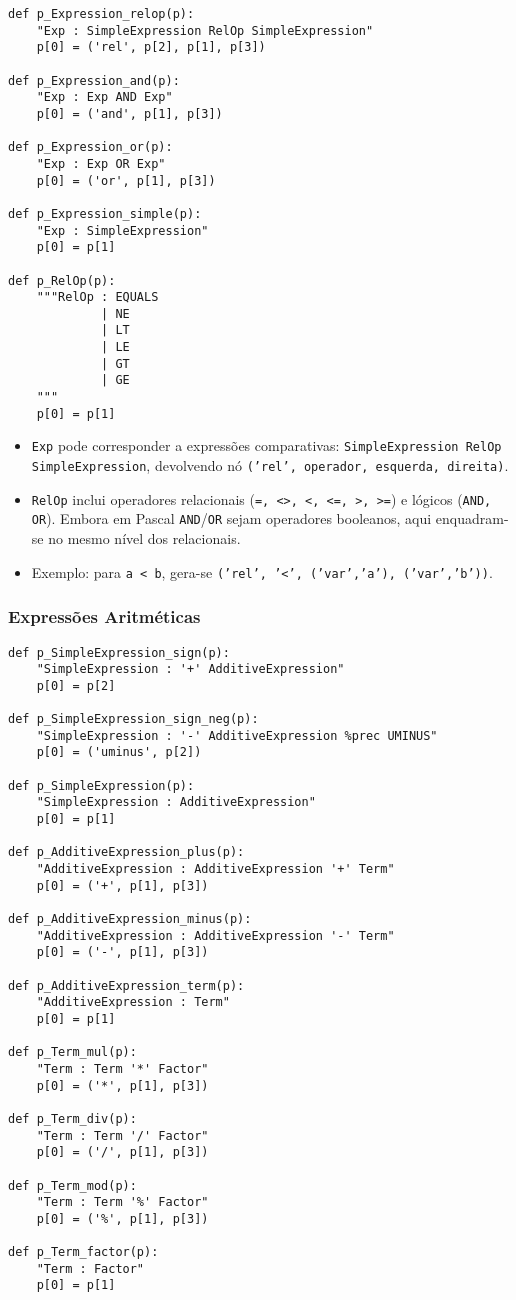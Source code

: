 \begin{verbatim}
def p_Expression_relop(p):
    "Exp : SimpleExpression RelOp SimpleExpression"
    p[0] = ('rel', p[2], p[1], p[3])

def p_Expression_and(p):
    "Exp : Exp AND Exp"
    p[0] = ('and', p[1], p[3])

def p_Expression_or(p):
    "Exp : Exp OR Exp"
    p[0] = ('or', p[1], p[3])

def p_Expression_simple(p):
    "Exp : SimpleExpression"
    p[0] = p[1]

def p_RelOp(p):
    """RelOp : EQUALS
             | NE
             | LT
             | LE
             | GT
             | GE
    """
    p[0] = p[1]
\end{verbatim}

\noindent

\begin{itemize}
    \item \texttt{Exp} pode corresponder a expressões comparativas: \texttt{SimpleExpression RelOp SimpleExpression}, devolvendo nó \texttt{('rel', operador, esquerda, direita)}.
    \item \texttt{RelOp} inclui operadores relacionais (\texttt{=, <>, <, <=, >, >=}) e lógicos (\texttt{AND, OR}). Embora em Pascal \texttt{AND}/\texttt{OR} sejam operadores booleanos, aqui enquadram-se no mesmo nível dos relacionais.
    \item Exemplo: para \texttt{a < b}, gera-se \texttt{('rel', '<', ('var','a'), ('var','b'))}.
\end{itemize}

\subsubsection{Expressões Aritméticas}

\begin{verbatim}
def p_SimpleExpression_sign(p):
    "SimpleExpression : '+' AdditiveExpression"
    p[0] = p[2]

def p_SimpleExpression_sign_neg(p):
    "SimpleExpression : '-' AdditiveExpression %prec UMINUS"
    p[0] = ('uminus', p[2])

def p_SimpleExpression(p):
    "SimpleExpression : AdditiveExpression"
    p[0] = p[1]

def p_AdditiveExpression_plus(p):
    "AdditiveExpression : AdditiveExpression '+' Term"
    p[0] = ('+', p[1], p[3])

def p_AdditiveExpression_minus(p):
    "AdditiveExpression : AdditiveExpression '-' Term"
    p[0] = ('-', p[1], p[3])

def p_AdditiveExpression_term(p):
    "AdditiveExpression : Term"
    p[0] = p[1]

def p_Term_mul(p):
    "Term : Term '*' Factor"
    p[0] = ('*', p[1], p[3])

def p_Term_div(p):
    "Term : Term '/' Factor"
    p[0] = ('/', p[1], p[3])

def p_Term_mod(p):
    "Term : Term '%' Factor"
    p[0] = ('%', p[1], p[3])

def p_Term_factor(p):
    "Term : Factor"
    p[0] = p[1]
\end{verbatim}


